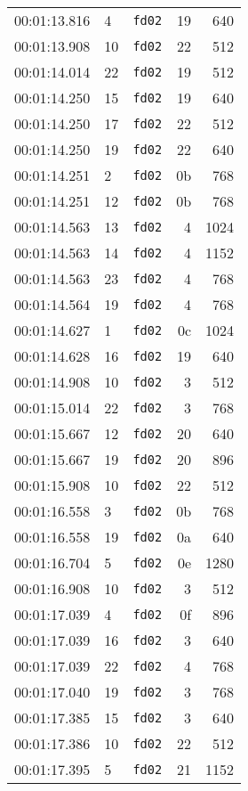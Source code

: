 \documentclass{article}
\begin{document}
\begin{longtable}{lllrr}
00:01:13.816 & 4 & \texttt{fd02} & 19 & 640 \\
00:01:13.908 & 10 & \texttt{fd02} & 22 & 512 \\
00:01:14.014 & 22 & \texttt{fd02} & 19 & 512 \\
00:01:14.250 & 15 & \texttt{fd02} & 19 & 640 \\
00:01:14.250 & 17 & \texttt{fd02} & 22 & 512 \\
00:01:14.250 & 19 & \texttt{fd02} & 22 & 640 \\
00:01:14.251 & 2 & \texttt{fd02} & 0b & 768 \\
00:01:14.251 & 12 & \texttt{fd02} & 0b & 768 \\
00:01:14.563 & 13 & \texttt{fd02} & 4 & 1024 \\
00:01:14.563 & 14 & \texttt{fd02} & 4 & 1152 \\
00:01:14.563 & 23 & \texttt{fd02} & 4 & 768 \\
00:01:14.564 & 19 & \texttt{fd02} & 4 & 768 \\
00:01:14.627 & 1 & \texttt{fd02} & 0c & 1024 \\
00:01:14.628 & 16 & \texttt{fd02} & 19 & 640 \\
00:01:14.908 & 10 & \texttt{fd02} & 3 & 512 \\
00:01:15.014 & 22 & \texttt{fd02} & 3 & 768 \\
00:01:15.667 & 12 & \texttt{fd02} & 20 & 640 \\
00:01:15.667 & 19 & \texttt{fd02} & 20 & 896 \\
00:01:15.908 & 10 & \texttt{fd02} & 22 & 512 \\
00:01:16.558 & 3 & \texttt{fd02} & 0b & 768 \\
00:01:16.558 & 19 & \texttt{fd02} & 0a & 640 \\
00:01:16.704 & 5 & \texttt{fd02} & 0e & 1280 \\
00:01:16.908 & 10 & \texttt{fd02} & 3 & 512 \\
00:01:17.039 & 4 & \texttt{fd02} & 0f & 896 \\
00:01:17.039 & 16 & \texttt{fd02} & 3 & 640 \\
00:01:17.039 & 22 & \texttt{fd02} & 4 & 768 \\
00:01:17.040 & 19 & \texttt{fd02} & 3 & 768 \\
00:01:17.385 & 15 & \texttt{fd02} & 3 & 640 \\
00:01:17.386 & 10 & \texttt{fd02} & 22 & 512 \\
00:01:17.395 & 5 & \texttt{fd02} & 21 & 1152 \\

\end{longtable}
\end{document}
